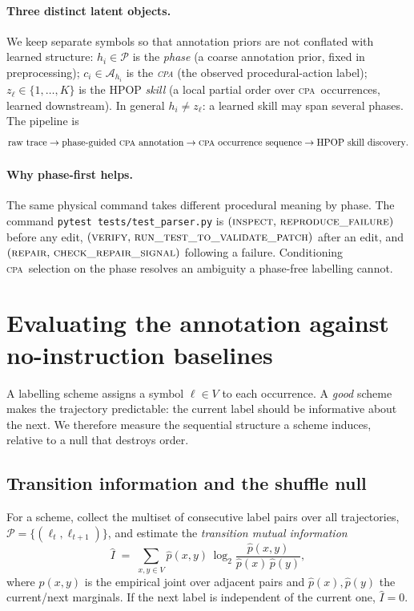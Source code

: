 \documentclass[11pt]{article}
\newcommand{\cpa}{\textsc{cpa}}
\begin{document}
\paragraph{Three distinct latent objects.}
We keep separate symbols so that annotation priors are not conflated with learned structure:
$h_i\in\mathcal P$ is the \emph{phase} (a coarse annotation prior, fixed in preprocessing);
$c_i\in\mathcal A_{h_i}$ is the \emph{\cpa} (the observed procedural-action label);
$z_\ell\in\{1,\dots,K\}$ is the HPOP \emph{skill} (a local partial order over \cpa\ occurrences,
learned downstream). In general $h_i\neq z_\ell$: a learned skill may span several phases. The pipeline
is
\[
\text{raw trace}\rightarrow\text{phase-guided \cpa\ annotation}\rightarrow
\text{\cpa\ occurrence sequence}\rightarrow\text{HPOP skill discovery}.
\]

\paragraph{Why phase-first helps.}
The same physical command takes different procedural meaning by phase. The command
\texttt{pytest tests/test\_parser.py} is $(\textsc{inspect},\,\textsc{reproduce\_failure})$ before any
edit, $(\textsc{verify},\,\textsc{run\_test\_to\_validate\_patch})$ after an edit, and
$(\textsc{repair},\,\textsc{check\_repair\_signal})$ following a failure. Conditioning \cpa\ selection on
the phase resolves an ambiguity a phase-free labelling cannot.

\section{Evaluating the annotation against no-instruction baselines}
\label{sec:eval}

A labelling scheme assigns a symbol $\ell\in V$ to each occurrence. A \emph{good} scheme makes
the trajectory predictable: the current label should be informative about the next. We
therefore measure the sequential structure a scheme induces, relative to a null that
destroys order.

\subsection{Transition information and the shuffle null}
For a scheme, collect the multiset of consecutive label pairs over all trajectories,
$\mathcal{P}=\{(\ell_t,\ell_{t+1})\}$, and estimate the \emph{transition mutual information}
\begin{equation}
\hat{I} \;=\; \sum_{x,y\in V} \hat{p}(x,y)\,
   \log_2\!\frac{\hat{p}(x,y)}{\hat{p}(x)\,\hat{p}(y)} ,
\label{eq:mi}
\end{equation}
where $\hat p(x,y)$ is the empirical joint over adjacent pairs and $\hat p(x),\hat p(y)$ the
current/next marginals. If the next label is independent of the current one, $\hat I=0$.
\end{document}
